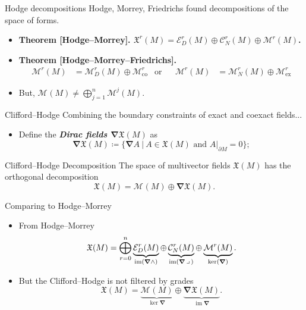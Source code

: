 \documentclass[aspectratio=169]{beamer}
\newcommand\boldgreen[1]{\textcolor{lighter_csu_green}{\emph{\textbf{#1}}}}
\newcommand\boldgold[1]{\textcolor{csu_gold}{\textbf{#1}}}
\newcommand{\im}{\operatorname{im}}
\newcommand{\grad}{\boldsymbol{\nabla}}
\newcommand{\monogenics}{\mathcal{M}}
\newcommand{\boundary}{{\partial M}}
\newcommand{\contract}{\hspace*{.5mm} \lrcorner \hspace*{.5mm}}
\newcommand{\monogenicfields}[1]{\mathcal{M}^{#1}(M)}
\newcommand{\smoothfields}{\mathfrak{X}}
\begin{document}
\begin{frame}{Hodge decompositions}
\vfill
Hodge, Morrey, Friedrichs found decompositions of the space of forms.
\begin{itemize}
  \pause
  \item \boldgold{Theorem [Hodge--Morrey]. $\smoothfields^r(M) = \mathcal{E}_D^r(M) \oplus \mathcal{C}_N^r(M) \oplus \monogenics^r(M)$.}
  \pause
  \item \boldgold{Theorem [Hodge--Morrey--Friedrichs].
  \begin{align*}
  \monogenics^r(M) &= \monogenics^r_D(M) \oplus \monogenics^r_{\textrm{co}} &\textrm{or} && \monogenics^r(M) &= \monogenics^r_N(M) \oplus \monogenics^r_{\textrm{ex}}
  \end{align*}
  }
  \pause
  \item \textcolor{dull_red}{But, $\monogenicfields{} \neq \bigoplus_{j=1}^n \monogenicfields{j}$.}
\end{itemize}
\vfill
\end{frame}

\begin{frame}{Clifford--Hodge}
\vfill
Combining the boundary constraints of exact and coexact fields...
\begin{itemize}
  \pause
  \item Define the \boldgreen{Dirac fields $\grad \smoothfields(M)$} as
  \[
      \grad \smoothfields(M) \coloneqq \{ \grad A ~\vert~ A \in \smoothfields(M) \textrm{~and~} A\vert_\boundary = 0\};
  \]
\end{itemize}
\pause
\begin{thm*}{Clifford--Hodge Decomposition}{}
The space of multivector fields $\smoothfields(M)$ has the orthogonal decomposition
\[
\smoothfields(M) = \monogenicfields{} \oplus \grad \smoothfields(M).
\]
\end{thm*}
\vfill
\end{frame}


\begin{frame}{Comparing to Hodge--Morrey}
\vfill
\begin{itemize}
\pause
\item From Hodge--Morrey
\[
\smoothfields(M) = \bigoplus_{r=0}^n \underbrace{\mathcal{E}_D^r(M)}_{\operatorname{im}(\grad \wedge)} \oplus \underbrace{\mathcal{C}_N^r(M)}_{\operatorname{im}(\grad \contract)} \oplus \underbrace{\mathcal{M}^r(M)}_{\operatorname{ker}(\grad)}.
\]
\pause
\item But the Clifford--Hodge is not filtered by grades
\[
\smoothfields(M) = \underbrace{\monogenicfields{}}_{\ker \grad} \oplus \underbrace{\grad \smoothfields(M)}_{\im \grad}.
\]
\end{itemize}
\vfill
\end{frame}
\end{document}
